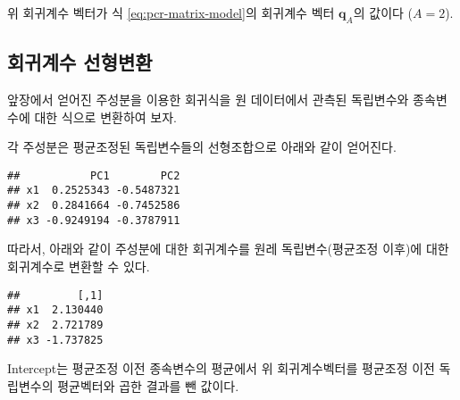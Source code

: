 \documentclass[]{book}
\newenvironment{Shaded}{\begin{snugshade}}{\end{snugshade}}
\newcommand{\KeywordTok}[1]{\textcolor[rgb]{0.13,0.29,0.53}{\textbf{#1}}}
\newcommand{\NormalTok}[1]{#1}
\newcommand{\OperatorTok}[1]{\textcolor[rgb]{0.81,0.36,0.00}{\textbf{#1}}}
\newcommand{\StringTok}[1]{\textcolor[rgb]{0.31,0.60,0.02}{#1}}
\begin{document}
위 회귀계수 벡터가 식 \eqref{eq:pcr-matrix-model}의 회귀계수 벡터 \(\mathbf{q}_A\)의 값이다 (\(A = 2\)).

\hypertarget{pcr-regression-transform}{%
\subsection{회귀계수 선형변환}\label{pcr-regression-transform}}

앞장에서 얻어진 주성분을 이용한 회귀식을 원 데이터에서 관측된 독립변수와 종속변수에 대한 식으로 변환하여 보자.

각 주성분은 평균조정된 독립변수들의 선형조합으로 아래와 같이 얻어진다.

\begin{Shaded}
\end{Shaded}

\begin{verbatim}
##           PC1        PC2
## x1  0.2525343 -0.5487321
## x2  0.2841664 -0.7452586
## x3 -0.9249194 -0.3787911
\end{verbatim}

따라서, 아래와 같이 주성분에 대한 회귀계수를 원레 독립변수(평균조정 이후)에 대한 회귀계수로 변환할 수 있다.

\begin{Shaded}
\end{Shaded}

\begin{verbatim}
##         [,1]
## x1  2.130440
## x2  2.721789
## x3 -1.737825
\end{verbatim}

Intercept는 평균조정 이전 종속변수의 평균에서 위 회귀계수벡터를 평균조정 이전 독립변수의 평균벡터와 곱한 결과를 뺀 값이다.

\begin{Shaded}
\end{Shaded}
\end{document}
